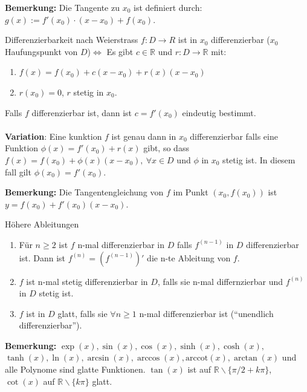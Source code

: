 \documentclass[a4paper,8pt]{extarticle}
\newenvironment{bemerkung}{
   \noindent \textbf{Bemerkung:  }}{}
\def\R{\mathbb{R}}
\begin{document}
\begin{bemerkung}
  Die Tangente zu $x_0$ ist definiert durch: $g(x) := f'(x_0) \cdot (x - x_0) + f(x_0)$.
\end{bemerkung}

\begin{subbox}{Differenzierbarkeit nach Weierstrass}
 $f: D \rightarrow R$ ist in $x_0$ differenzierbar ($x_0$ Haufungspunkt von $D$)$\iff$ Es gibt $c \in \R$ und $r: D \to \R$ mit:
 \begin{enumerate}
   \item $f(x) = f(x_0) + c(x - x_0) + r(x) (x - x_0)$ 
   \item $r(x_0) = 0$, $r$ stetig in $x_0$.
 \end{enumerate}
 Falls $f$ differenzierbar ist, dann ist $c = f'(x_0)$ eindeutig bestimmt. \\ \\
 \textbf{Variation}: Eine kunktion $f$ ist genau dann in $x_0$ differenzierbar falls eine Funktion $\phi(x) = f'(x_0) + r(x)$ gibt, so dass $f(x) = f(x_0) + \phi(x) (x-x_0), \ \forall x \in D$ und $\phi$ in $x_0$ stetig ist. In diesem fall gilt $\phi(x_0) = f'(x_0)$.
\end{subbox}
\begin{bemerkung}
  Die Tangentengleichung von $f$ im Punkt $(x_0, f(x_0))$ ist $y = f(x_0) + f'(x_0)(x - x_0)$.
\end{bemerkung}

\begin{mainbox}{Höhere Ableitungen}
 \begin{enumerate}
  \item Für $n \ge 2$ ist $f$ n-mal differenzierbar in $D$ falls $f^{(n-1)}$ in $D$ differenzierbar ist. Dann ist $f^{(n)} = (f^{(n-1)})'$ die n-te Ableitung von $f$.
  \item $f$ ist n-mal stetig differenzierbar in $D$, falls sie n-mal differnzierbar und $f^{(n)}$ in $D$ stetig ist.
  \item $f$ ist in $D$ glatt, falls sie $\forall n \ge 1$ n-mal differenzierbar ist (``unendlich differenzierbar'').
 \end{enumerate}
\end{mainbox}
\begin{bemerkung}
  $\exp(x), \sin(x), \cos(x), \sinh(x), \cosh(x),$ \\ $ \tanh(x), \ln(x), \arcsin(x), \arccos(x), \text{arccot}(x), \arctan(x)$ und alle Polynome sind glatte Funktionen. $\tan(x)$ ist auf $\R \backslash \{\pi/2 + k\pi\}$, $\cot(x)$ auf $\R \backslash \{k\pi\}$ glatt.
\end{bemerkung}
\end{document}
